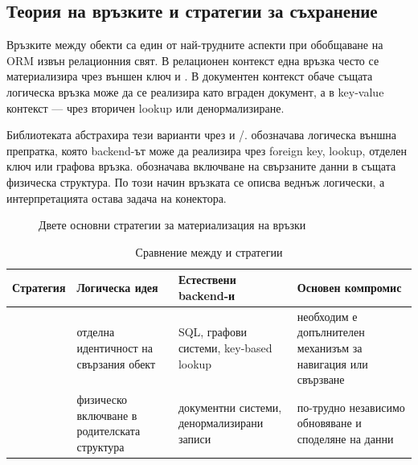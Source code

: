 \subsection{Теория на връзките и стратегии за съхранение}

Връзките между обекти са един от най-трудните аспекти при обобщаване на ORM извън релационния свят. В релационен контекст една връзка често се материализира чрез външен ключ и . В документен контекст обаче същата логическа връзка може да се реализира като вграден документ, а в key-value контекст --- чрез вторичен lookup или денормализиране.

Библиотеката абстрахира тези варианти чрез  и /.  обозначава логическа външна препратка, която backend-ът може да реализира чрез foreign key, lookup, отделен ключ или графова връзка.  обозначава включване на свързаните данни в същата физическа структура. По този начин връзката се описва веднъж логически, а интерпретацията остава задача на конектора.

\begin{figure}[H]
\centering
{}
\caption{Двете основни стратегии за материализация на връзки}
\label{fig:relationship_strategies}
\end{figure}

\begin{table}[H]
\centering
\small
\caption{Сравнение между  и  стратегии}
\label{tab:relationship_strategies}
\begin{tabularx}{\textwidth}{L{2.8cm}L{3.2cm}L{3.0cm}Y}
\toprule
\textbf{Стратегия} & \textbf{Логическа идея} & \textbf{Естествени backend-и} & \textbf{Основен компромис} \\
\midrule
{} & отделна идентичност на свързания обект & SQL, графови системи, key-based lookup & необходим е допълнителен механизъм за навигация или свързване \\
 & физическо включване в родителската структура & документни системи, денормализирани записи & по-трудно независимо обновяване и споделяне на данни \\
\bottomrule
\end{tabularx}
\end{table}

